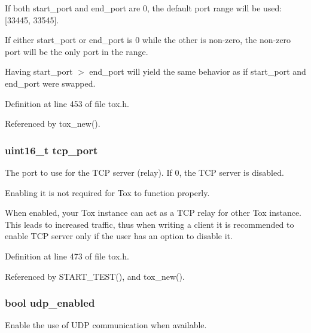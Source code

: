 If both start\+\_\+port and end\+\_\+port are 0, the default port range will be used\+: \mbox{[}33445, 33545\mbox{]}.

If either start\+\_\+port or end\+\_\+port is 0 while the other is non-\/zero, the non-\/zero port will be the only port in the range.

Having start\+\_\+port $>$ end\+\_\+port will yield the same behavior as if start\+\_\+port and end\+\_\+port were swapped. 

Definition at line 453 of file tox.\+h.



Referenced by tox\+\_\+new().

\hypertarget{struct_tox___options_a7c66715252e093e0b8b751a0c888623e}{
\subsubsection[{tcp\+\_\+port}]{\setlength{\rightskip}{0pt plus 5cm}uint16\+\_\+t tcp\+\_\+port}}\label{struct_tox___options_a7c66715252e093e0b8b751a0c888623e}
The port to use for the T\+C\+P server (relay). If 0, the T\+C\+P server is disabled.

Enabling it is not required for Tox to function properly.

When enabled, your Tox instance can act as a T\+C\+P relay for other Tox instance. This leads to increased traffic, thus when writing a client it is recommended to enable T\+C\+P server only if the user has an option to disable it. 

Definition at line 473 of file tox.\+h.



Referenced by S\+T\+A\+R\+T\+\_\+\+T\+E\+S\+T(), and tox\+\_\+new().

\hypertarget{struct_tox___options_a35c23f2b9cd2468e2a256ca93a21d5d5}{
\subsubsection[{udp\+\_\+enabled}]{\setlength{\rightskip}{0pt plus 5cm}bool udp\+\_\+enabled}}\label{struct_tox___options_a35c23f2b9cd2468e2a256ca93a21d5d5}
Enable the use of U\+D\+P communication when available.

